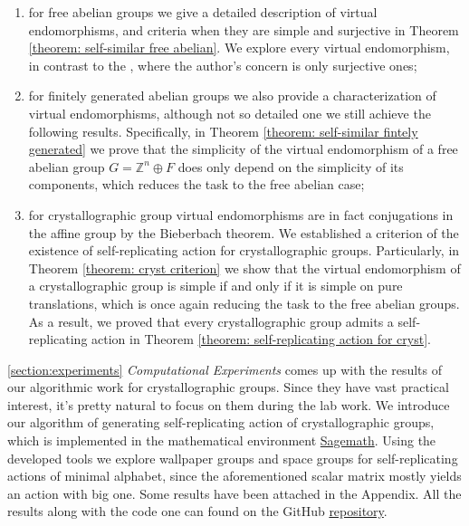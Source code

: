 \documentclass[a4paper,12pt]{amsart}
\theoremstyle{definition}
\begin{document}
	\begin{enumerate}
		\item for free abelian groups we give a detailed description of virtual endomorphisms, and criteria when they are simple and surjective in Theorem \ref{theorem: self-similar free abelian}. We explore every virtual endomorphism, in contrast to the \cite{Nekrashevych:virtual_endomorphisms}, where the author's concern is only surjective ones; 
		
		\item for finitely generated abelian groups we also provide a characterization of virtual endomorphisms, although not so detailed one we still achieve the following results. Specifically, in Theorem \ref{theorem: self-similar fintely generated} we prove that the simplicity of the virtual endomorphism of a free abelian group $G = \mathbb{Z}^n \oplus F$ does only depend on the simplicity of its components, which reduces the task to the free abelian case;  
		
		\item for crystallographic group virtual endomorphisms are in fact conjugations in the affine group by the Bieberbach theorem. We established a criterion of the existence of self-replicating action for crystallographic groups. Particularly, in Theorem \ref{theorem: cryst criterion} we show that the virtual endomorphism of a crystallographic group is simple if and only if it is simple on pure translations, which is once again reducing the task to the free abelian groups. As a result, we proved that every crystallographic group admits a self-replicating action in Theorem \ref{theorem: self-replicating action for cryst}.
	\end{enumerate}
	\ref{section:experiments} \textit{Computational Experiments} comes up with the results of our algorithmic work for crystallographic groups. Since they have vast practical interest, it's pretty natural to focus on them during the lab work. We introduce our algorithm of generating self-replicating action of crystallographic groups, which is implemented in the mathematical environment \href{https://www.sagemath.org/}{Sagemath}. Using the developed tools we explore wallpaper groups and space groups for self-replicating actions of minimal alphabet, since the aforementioned scalar matrix mostly yields an action with big one. Some results have been attached in the Appendix. All the results along with the code one can found on the GitHub \href{https://github.com/davendiy/master_thesis}{repository}.
	
\end{document}
